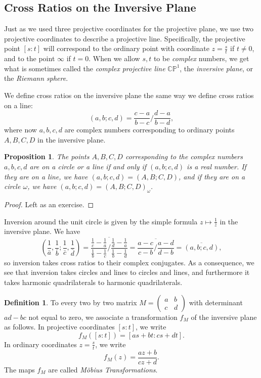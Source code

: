 \documentclass[letterpaper,11pt]{article}
\newtheorem{prop}{Proposition}
\theoremstyle{definition}
\newtheorem{defn}{Definition}
\theoremstyle{remark}
\begin{document}
\subsection{Cross Ratios on the Inversive Plane}

Just as we used three projective coordinates for the projective plane, we use two projective coordinates to describe a projective line. Specifically, the projective point $[s:t]$ will correspond to the ordinary point with coordinate $z = \frac{s}{t}$ if $t\ne 0$, and to the point $\infty$ if $t=0$. When we allow $s,t$ to be \emph{complex} numbers, we get what is sometimes called the \emph{complex projective line} $\mathbb{CP}^1$, the \emph{inversive plane}, or the \emph{Riemann sphere}.

We define cross ratios on the inversive plane the same way we define cross ratios on a line:
\[
(a,b;c,d) = \frac{c-a}{b-c}\bigg/\frac{d-a}{b-d},
\]
where now $a,b,c,d$ are complex numbers corresponding to ordinary points $A,B,C,D$ in the inversive plane.

\begin{prop} The points $A,B,C,D$ corresponding to the complex numbers $a,b,c,d$ are on a circle or a line if and only if $(a,b;c,d)$ is a real number. If they are on a line, we have $(a,b;c,d) = (A,B;C,D)$, and if they are on a circle $\omega$, we have $(a,b;c,d) = (A,B;C,D)_{\omega}$.
\end{prop}
\begin{proof} Left as an exercise.
\end{proof}

Inversion around the unit circle is given by the simple formula $z\mapsto \frac{1}{\bar{z}}$ in the inversive plane. We have
\[
\left(\frac{1}{\bar{a}},\frac{1}{\bar{b}};\frac{1}{\bar{c}},\frac{1}{\bar{d}}\right) = \overline{\frac{\frac{1}{c}-\frac{1}{a}}{\frac{1}{b}-\frac{1}{c}}\bigg/\frac{\frac{1}{d}-\frac{1}{a}}{\frac{1}{b}-\frac{1}{d}}} = \overline{\frac{a-c}{c-b}\bigg/\frac{a-d}{d-b}} = \overline{(a,b;c,d)},
\]
so inversion takes cross ratios to their complex conjugates. As a consequence, we see that inversion takes circles and lines to circles and lines, and furthermore it takes harmonic quadrilaterals to harmonic quadrilaterals.

\begin{defn} To every two by two matrix $M=\left(\begin{array}{cc}a & b\\ c & d\end{array}\right)$ with determinant $ad-bc$ not equal to zero, we associate a transformation $f_M$ of the inversive plane as follows. In projective coordinates $[s:t]$, we write
\[
f_M([s:t]) = [as+bt:cs+dt].
\]
In ordinary coordinates $z = \frac{s}{t}$, we write
\[
f_M(z) = \frac{az+b}{cz+d}.
\]
The maps $f_M$ are called \emph{M\"obius Transformations}.
\end{defn}
\end{document}
